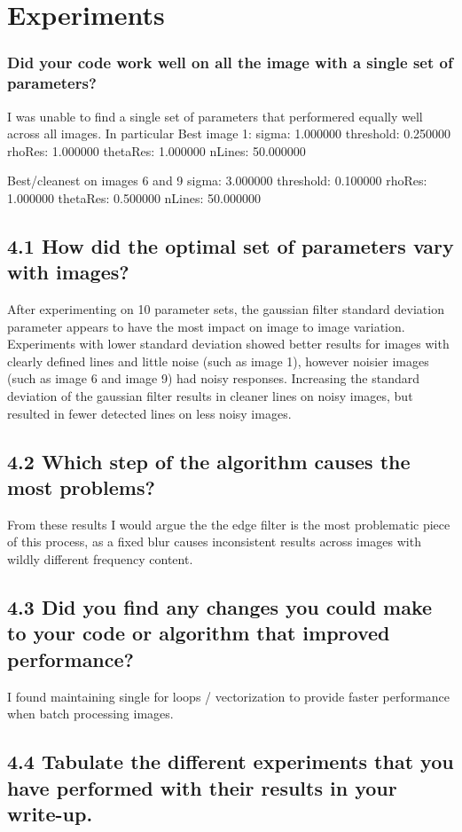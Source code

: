 \documentclass[12pt]{article}
\begin{document}
\section{Experiments}
\subsubsection{Did your code work well on all the image with a single set of parameters? }

I was unable to find a single set of parameters that performered equally well across all images. In particular
Best image 1:
sigma: 1.000000
threshold: 0.250000
rhoRes: 1.000000
thetaRes: 1.000000
nLines: 50.000000

Best/cleanest on images 6 and 9
sigma: 3.000000
threshold: 0.100000
rhoRes: 1.000000
thetaRes: 0.500000
nLines: 50.000000

\subsection{4.1 How did the optimal set of parameters vary with images? }
After experimenting on 10 parameter sets, the gaussian filter standard deviation parameter appears to have the most impact on image to image variation. Experiments with lower standard deviation showed better results for images with clearly defined lines and little noise (such as image 1), however noisier images (such as image 6 and image 9) had noisy responses.
Increasing the standard deviation of the gaussian filter results in cleaner lines on noisy images, but resulted in fewer detected lines on less noisy images.

\subsection{4.2 Which step of the algorithm causes the most problems? }
From these results I would argue the the edge filter is the most problematic piece of this process, as a fixed blur causes inconsistent results across images with wildly different frequency content.

\subsection{4.3 Did you find any changes you could make to your code or algorithm that improved performance?}
I found maintaining single for loops / vectorization to provide faster performance when batch processing images.

\subsection{4.4 Tabulate the different experiments that you have performed with their results in your write-up.}
\end{document}
